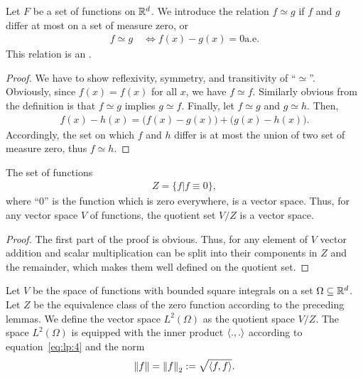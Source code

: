 \begin{lemma}
  Let $F$ be a set of functions on $\mathbb R^d$. We introduce the relation
  $f\simeq g$ if $f$ and $g$ differ at most on a set of measure zero,
  or
  \begin{gather}
    f\simeq g
    \quad\Leftrightarrow f(x)-g(x)=0 \text{a.e.}
  \end{gather}
 This relation is an .
\end{lemma}

\begin{proof}
  We have to show reflexivity, symmetry, and transitivity of
  ``$\simeq$''. Obviously, since $f(x)=f(x)$ for all $x$, we have
  $f\simeq f$. Similarly obvious from the definition is that $f\simeq
  g$ implies $g\simeq f$. Finally, let $f\simeq g$ and $g\simeq
  h$. Then,
  \begin{gather*}
    f(x)-h(x) = \bigl(f(x)-g(x)\bigr) + \bigl(g(x)-h(x)\bigr).
  \end{gather*}
  Accordingly, the set on which $f$ and $h$ differ is at most the union of
  two set of measure zero, thus $f\simeq h$.
\end{proof}

\begin{lemma}
  The set of functions
  \begin{gather*}
    Z = \bigl\{ f \big| f\equiv 0 \bigr\},
  \end{gather*}
  where ``0'' is the function which is zero everywhere, is a vector
  space. Thus, for any vector space $V$ of functions, the quotient set
  $V/Z$ is a vector space.
\end{lemma}

\begin{proof}
  The first part of the proof is obvious. Thus, for any element of $V$
  vector addition and scalar multiplication can be split into their
  components in $Z$ and the remainder, which makes them well defined
  on the quotient set.
\end{proof}

\begin{definition}

  Let $V$ be the space of functions with bounded square integrals on a
  set $\Omega\subseteq \mathbb R^d$. Let $Z$ be the equivalence class of the
  zero function according to the preceding lemmas. We define the
  vector space $L^2(\Omega)$ as the quotient space $V/Z$. The space
  $L^2(\Omega)$ is equipped with the inner product $\scal(.,.)$
  according to equation~\eqref{eq:lp:4} and the norm
  \begin{gather}
    \norm{f} = \norm{f}_2 := \sqrt{\scal(f,f)}.
  \end{gather}
\end{definition}

